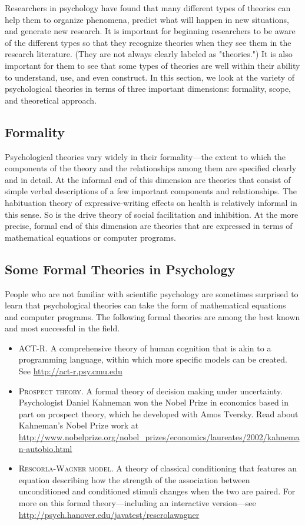 Researchers in psychology have found that many different types of theories can help them to organize phenomena, predict what will happen in new situations, and generate new research. It is important for beginning researchers to be aware of the different types so that they recognize theories when they see them in the research literature. (They are not always clearly labeled as "theories.") It is also important for them to see that some types of theories are well within their ability to understand, use, and even construct. In this section, we look at the variety of psychological theories in terms of three important dimensions: formality, scope, and theoretical approach.

\subsection{Formality}

Psychological theories vary widely in their formality---the extent to which the components of the theory and the relationships among them are specified clearly and in detail. At the informal end of this dimension are theories that consist of simple verbal descriptions of a few important components and relationships. The habituation theory of expressive-writing effects on health is relatively informal in this sense. So is the drive theory of social facilitation and inhibition. At the more precise, formal end of this dimension are theories that are expressed in terms of mathematical equations or computer programs.

\subsection{Some Formal Theories in Psychology}

People who are not familiar with scientific psychology are sometimes surprised to learn that psychological theories can take the form of mathematical equations and computer programs. The following formal theories are among the best known and most successful in the field.

\begin{itemize}
\item \textsc{ACT-R}. A comprehensive theory of human cognition that is akin to a programming language, within which more specific models can be created. See \url{http://act-r.psy.cmu.edu}
\item \textsc{Prospect theory}. A formal theory of decision making under uncertainty. Psychologist Daniel Kahneman won the Nobel Prize in economics based in part on prospect theory, which he developed with Amos Tversky. Read about Kahneman's Nobel Prize work at \url{http://www.nobelprize.org/nobel_prizes/economics/laureates/2002/kahneman-autobio.html}
\item \textsc{Rescorla-Wagner model}. A theory of classical conditioning that features an equation describing how the strength of the association between unconditioned and conditioned stimuli changes when the two are paired. For more on this formal theory---including an interactive
version---see \url{http://psych.hanover.edu/javatest/rescrolawagner}
\end{itemize}



